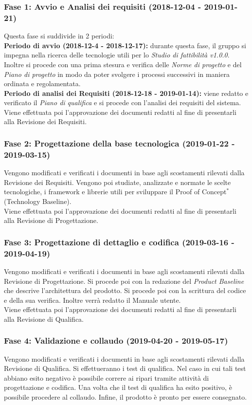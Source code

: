 \subsubsection{Fase 1: Avvio e Analisi dei requisiti (2018-12-04 - 2019-01-21)} 
Questa fase si suddivide in 2 periodi: \\
\textbf{Periodo di avvio (2018-12-4 - 2018-12-17):} 
durante questa fase, il gruppo si impegna nella ricerca delle tecnologie utili per lo \textit{Studio di fattibilità v1.0.0}. Inoltre si procede con una prima stesura e verifica delle \textit{Norme di progetto} e del \textit{Piano di progetto} in modo da poter svolgere i processi successivi in maniera ordinata e regolamentata.\\
\textbf{Periodo di analisi dei Requisiti (2018-12-18 - 2019-01-14):} viene redatto e verificato il \textit{Piano di qualifica} e si procede con l'analisi dei requisiti del sistema.
Viene effettuata poi l'approvazione dei documenti redatti al fine di presentarli alla Revisione dei Requisiti.
\subsubsection{Fase 2: Progettazione della base tecnologica (2019-01-22 - 2019-03-15)}
Vengono modificati e verificati i documenti in base agli scostamenti rilevati dalla Revisione dei Requisiti.
Vengono poi studiate, analizzate e normate le scelte tecnologiche, i framework e librerie utili per sviluppare il Proof of Concept$^*$ (Technology Baseline).\\
Viene effettuata poi l'approvazione dei documenti redatti al fine di presentarli alla Revisione di Progettazione.

\subsubsection{Fase 3: Progettazione di dettaglio e codifica (2019-03-16 - 2019-04-19)}
Vengono modificati e verificati i documenti in base agli scostamenti rilevati dalla Revisione di Progettazione.
Si procede poi con la redazione del \textit{Product Baseline} che descrive l'architettura del prodotto.
Si procede poi con la scrittura del codice e della sua verifica.
Inoltre verrà redatto il Manuale utente.\\
Viene effettuata poi l'approvazione dei documenti redatti al fine di presentarli alla Revisione di Qualifica.
\subsubsection{Fase 4: Validazione e collaudo (2019-04-20 - 2019-05-17)}
Vengono modificati e verificati i documenti in base agli scostamenti rilevati dalla Revisione di Qualifica.
Si effettueranno i test di qualifica. Nel caso in cui tali test abbiano esito negativo è possibile correre ai ripari tramite attività di progettazione e codifica. Una volta che il test di qualifica ha esito positivo, è possibile procedere al collaudo.
Infine, il prodotto è pronto per essere consegnato.

